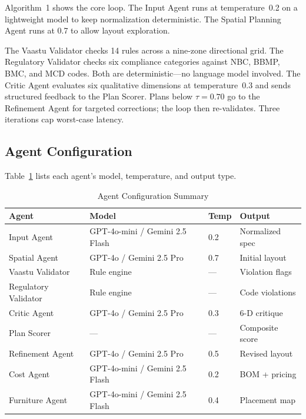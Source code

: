 \documentclass[journal]{IEEEtran}
\begin{document}
Algorithm~1 shows the core loop. The Input Agent runs at temperature~0.2 on
a lightweight model to keep normalization deterministic. The Spatial Planning
Agent runs at 0.7 to allow layout exploration.

The Vaastu Validator checks 14 rules across a nine-zone directional grid.
The Regulatory Validator checks six compliance categories against NBC, BBMP,
BMC, and MCD codes. Both are deterministic---no language model involved.
The Critic Agent evaluates six qualitative dimensions at temperature~0.3 and
sends structured feedback to the Plan Scorer. Plans below $\tau = 0.70$ go
to the Refinement Agent for targeted corrections; the loop then re-validates.
Three iterations cap worst-case latency.

\subsection{Agent Configuration}

Table~\ref{tab:agents} lists each agent's model, temperature, and output type.

\begin{table}[t]
\centering
\caption{Agent Configuration Summary}
\label{tab:agents}
\scriptsize
\setlength{\tabcolsep}{5pt}
\renewcommand{\arraystretch}{1.15}
\begin{tabular}{llll}
\toprule
\textbf{Agent} & \textbf{Model} & \textbf{Temp} & \textbf{Output} \\
\midrule
Input Agent          & GPT-4o-mini / Gemini 2.5 Flash & 0.2  & Normalized spec \\
Spatial Agent        & GPT-4o / Gemini 2.5 Pro        & 0.7  & Initial layout  \\
Vaastu Validator     & Rule engine                    & ---  & Violation flags \\
Regulatory Validator & Rule engine                    & ---  & Code violations \\
Critic Agent         & GPT-4o / Gemini 2.5 Pro        & 0.3  & 6-D critique    \\
Plan Scorer          & ---                            & ---  & Composite score \\
Refinement Agent     & GPT-4o / Gemini 2.5 Pro        & 0.5  & Revised layout  \\
Cost Agent           & GPT-4o-mini / Gemini 2.5 Flash & 0.2  & BOM + pricing   \\
Furniture Agent      & GPT-4o-mini / Gemini 2.5 Flash & 0.4  & Placement map   \\
\bottomrule
\end{tabular}
\end{table}
\end{document}
